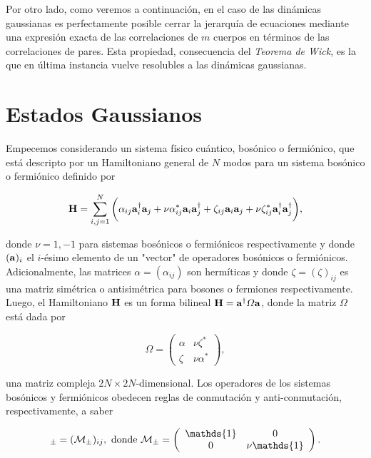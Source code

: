\documentclass{report} %
\numberwithin{equation}{section}
\begin{document}
Por otro lado, como veremos a continuación, en el caso de las dinámicas gaussianas es perfectamente posible cerrar la jerarquía de ecuaciones mediante una expresión exacta de las correlaciones de $m$ cuerpos en términos de las correlaciones de pares. Esta propiedad, consecuencia del \emph{Teorema de Wick}\cite{Fetter}, es la que en última instancia vuelve resolubles a las dinámicas gaussianas.  




\section{Estados Gaussianos}
Empecemos considerando un sistema físico cuántico, bosónico o fermiónico, que está descripto por un  Hamiltoniano general de $N$ modos para un sistema bosónico o fermiónico \cite{RMNPhysRevA.82.052332, PhysRevA.104.012415} 
definido por

\begin{equation}
    {\bf H} = \sum_{i,j=1}^{N} \bigg(\alpha_{ij} {\bf a}^{\dagger}_i{\bf a}_j+\nu \alpha_{ij}^{*} {\bf a}_i{\bf a}^{\dagger}_j+\zeta_{ij}{\bf a}_i{\bf a}_j+\nu\zeta^{*}_{ij} {\bf a}^{\dagger}_i {\bf a}^{\dagger}_j\bigg),
\end{equation}

donde $\nu = 1, -1$ para sistemas bosónicos o fermiónicos respectivamente y donde $({\bf a})_i$ el $i$-ésimo elemento de un "vector" de operadores bosónicos o fermiónicos. Adicionalmente, las matrices $\alpha = (\alpha_{ij})$ son hermíticas y donde $\zeta = (\zeta)_{ij}$ es una matriz simétrica o antisimétrica para bosones o fermiones respectivamente. Luego, el Hamiltoniano ${\bf H}$ es un forma bilineal ${\bf H} = {\bf a}^{\dagger} \Omega {\bf a}$, donde la matriz $\Omega$ está dada por

\begin{equation}
    \Omega = \left(\begin{array}{cc}
      \alpha  & \nu \zeta^{*}  \\
      \zeta   & \nu \alpha^{*} 
    \end{array}\right),
\end{equation}

una matriz compleja $2N \times 2N$-dimensional. Los operadores de los sistemas bosónicos y fermiónicos obedecen reglas de conmutación y anti-conmutación, respectivamente, a saber

\begin{align}
    [{\bf a}_i, {\bf a}^{\dagger}_j]_{\pm} = (\mathcal{M}_{\pm})_{ij}, \textnormal{ donde } \mathcal{M}_{\pm}= \left(\begin{array}{cc}
        \mathds{1} & 0  \\
        0 & \nu \mathds{1} 
    \end{array}\right).
\end{align}
\end{document}
